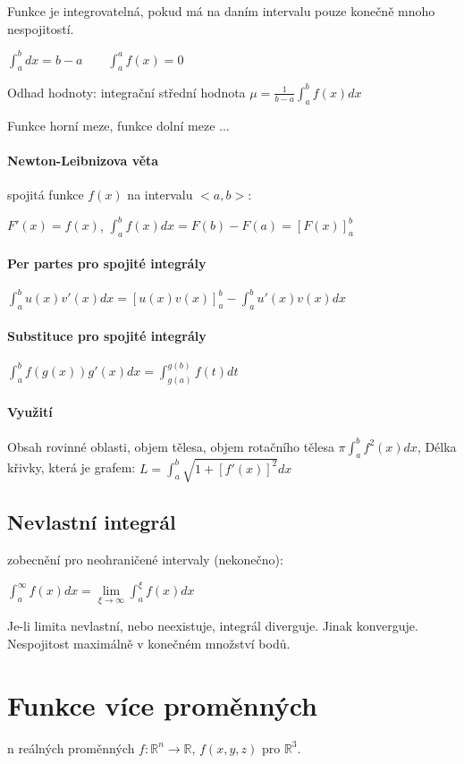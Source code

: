 \documentclass[a4paper, 11pt]{report}
\begin{document}
Funkce je integrovatelná, pokud má na daním intervalu pouze konečně mnoho nespojitostí.

$\int_a^b dx = b - a \qquad \int_a^a f(x) = 0$

Odhad hodnoty: integrační střední hodnota $\mu = \frac{1}{b-a} \int_a^b f(x) dx$

Funkce horní meze, funkce dolní meze ...

\paragraph{Newton-Leibnizova věta} spojitá funkce $f(x)$ na intervalu $<a, b>$:

$F'(x) = f(x)$, $\int_a^b f(x) dx = F(b) - F(a) = \left[ F(x) \right]_a^b$

\paragraph{Per partes pro spojité integrály}

$\int_a^b u(x) v'(x) dx = [u(x) v(x) ]_a^b - \int_a^b u'(x) v(x) dx$

\paragraph{Substituce pro spojité integrály}

$\int_a^b f(g(x))g'(x) dx = \int_{g(a)}^{g(b)}f(t) dt$

\paragraph{Využití} Obsah rovinné oblasti, objem tělesa, objem rotačního tělesa $\pi \int_a^b f^2(x) dx$, Délka křivky, která je grafem: $L = \int_a^b \sqrt{1+[f'(x)]^2} dx$


\subsection{Nevlastní integrál} zobecnění pro neohraničené intervaly (nekonečno):

$\int_a^\infty f(x) dx = \lim\limits_{\xi \to \infty} \int_a^\xi f(x) dx$

Je-li limita nevlastní, nebo neexistuje, integrál diverguje. Jinak konverguje. Nespojitost maximálně v konečném množství bodů.

\section{Funkce více proměnných}
n reálných proměnných $f: \mathbb{R}^n \to \mathbb{R}$, $f(x,y,z)$ pro $\mathbb{R}^3$.
\end{document}
